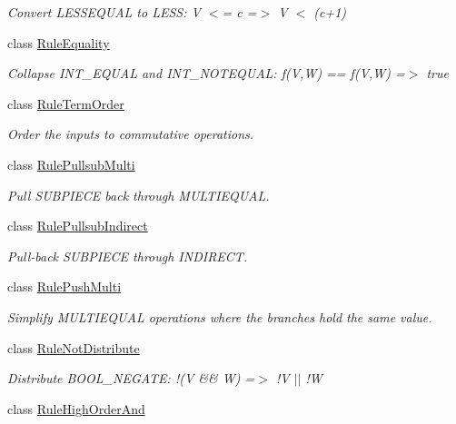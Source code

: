 \begin{DoxyCompactItemize}
\begin{DoxyCompactList}\small\item\em Convert L\+E\+S\+S\+E\+Q\+U\+AL to L\+E\+SS\+: {\ttfamily V $<$= c =$>$ V $<$ (c+1)} \end{DoxyCompactList}\item 
class \mbox{\hyperlink{class_rule_equality}{Rule\+Equality}}
\begin{DoxyCompactList}\small\item\em Collapse I\+N\+T\+\_\+\+E\+Q\+U\+AL and I\+N\+T\+\_\+\+N\+O\+T\+E\+Q\+U\+AL\+: {\ttfamily f(\+V,\+W) == f(\+V,\+W) =$>$ true} \end{DoxyCompactList}\item 
class \mbox{\hyperlink{class_rule_term_order}{Rule\+Term\+Order}}
\begin{DoxyCompactList}\small\item\em Order the inputs to commutative operations. \end{DoxyCompactList}\item 
class \mbox{\hyperlink{class_rule_pullsub_multi}{Rule\+Pullsub\+Multi}}
\begin{DoxyCompactList}\small\item\em Pull S\+U\+B\+P\+I\+E\+CE back through M\+U\+L\+T\+I\+E\+Q\+U\+AL. \end{DoxyCompactList}\item 
class \mbox{\hyperlink{class_rule_pullsub_indirect}{Rule\+Pullsub\+Indirect}}
\begin{DoxyCompactList}\small\item\em Pull-\/back S\+U\+B\+P\+I\+E\+CE through I\+N\+D\+I\+R\+E\+CT. \end{DoxyCompactList}\item 
class \mbox{\hyperlink{class_rule_push_multi}{Rule\+Push\+Multi}}
\begin{DoxyCompactList}\small\item\em Simplify M\+U\+L\+T\+I\+E\+Q\+U\+AL operations where the branches hold the same value. \end{DoxyCompactList}\item 
class \mbox{\hyperlink{class_rule_not_distribute}{Rule\+Not\+Distribute}}
\begin{DoxyCompactList}\small\item\em Distribute B\+O\+O\+L\+\_\+\+N\+E\+G\+A\+TE\+: {\ttfamily !(V \&\& W) =$>$ !V $\vert$$\vert$ !W} \end{DoxyCompactList}\item 
class \mbox{\hyperlink{class_rule_high_order_and}{Rule\+High\+Order\+And}}

\end{DoxyCompactItemize}
